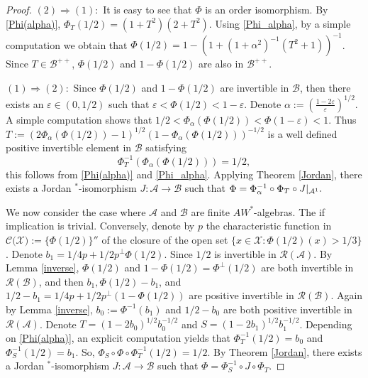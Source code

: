 \documentclass[12pt]{amsart}
\theoremstyle{definition}
\theoremstyle{remark}
\numberwithin{equation}{section}
\begin{document}
\begin{proof}
	$(\textit{2})\Rightarrow(\textit{1}):$ It is easy to see that $\Phi$  is an order isomorphism. By \eqref{Phi(alpha)}, $\Phi_T(1/2)=(1+T^2)(2+T^2)$. Using \eqref{Phi_alpha}, by a simple computation we obtain that $\Phi\left(1/2\right) = 1 - \left(1+(1+\alpha^2)^{-1}(T^2 + 1)\right)^{-1}$. Since $T\in\mathcal{B}^{++}$, $\Phi(1/2)$ and $1-\Phi(1/2)$ are also in $\mathcal{B}^{++}$.
	
	
$(\textit{1})\Rightarrow(\textit{2}):$ Since  $\Phi(1/2)$ and $1-\Phi(1/2)$ are invertible in $\mathcal{B}$, then there exists an $\varepsilon\in(0,1/2)$ such that $\varepsilon<\Phi(1/2)<1-\varepsilon$. Denote $\alpha:= \left( \frac{1-2\varepsilon}{\varepsilon}\right)^{1/2}$. A simple computation shows that $1/2<\Phi_\alpha\left( \Phi(1/2)\right)<\Phi(1-\varepsilon)<1$. Thus $T:=\left(2\Phi_\alpha(\Phi(1/2))-1\right)^{1/2}\left(1- \Phi_\alpha(\Phi(1/2))\right) ^{-1/2}$ is a well defined  positive invertible element in $\mathcal{B}$ satisfying 	$$\Phi^{-1}_{T}\left( \Phi_\alpha\left( \Phi(1/2)\right)\right)=1/2,$$ 
this follows from \eqref{Phi(alpha)} and \eqref{Phi_alpha}. Applying Theorem \ref{Jordan}, there exists a Jordan $^*$-isomorphism $J:\mathcal{A}\to\mathcal{B}$ such that $\Phi=\Phi_\alpha^{-1}\circ\Phi_{T}\circ J\arrowvert_{\mathcal{A}^1}.$	



We now consider the case where $\mathcal{A}$ and $\mathcal{B}$ are finite $AW^*$-algebras. The if implication is trivial. Conversely,  denote by $p$ the characteristic function in $\mathcal{C(X}):=\{\Phi(1/2)\}''$ of the closure of the open set $\{x\in\mathcal{X}: \Phi(1/2)(x)>1/3\}$. Denote $b_1=1/4p+1/2p^{\perp}\Phi(1/2)$. Since $1/2$ is invertible in $\mathcal{R(A)}$. By Lemma \ref{inverse}, $\Phi(1/2)$ and $1-\Phi(1/2)=\Phi^{\perp}(1/2)$ are both invertible in $\mathcal{R(B)}$, and then $b_1,\Phi(1/2)-b_1$, and $1/2-b_1=1/4p+1/2p^\perp(1-\Phi(1/2))$ are positive invertible in $\mathcal{R(B)}$. Again by Lemma \ref{inverse}, $b_0:=\Phi^{-1}(b_1)$ and $1/2-b_0$ are both positive invertible in  $\mathcal{R(A)}$. Denote $T=(1-2b_0)^{1/2}b_0^{-1/2}$ and $S=(1-2b_1)^{1/2}b_1^{-1/2}$. Depending on \eqref{Phi(alpha)}, an explicit computation yields  that $\Phi_T^{-1}(1/2)=b_0$ and $\Phi_S^{-1}(1/2)=b_1$. So,  $\Phi_S\circ\Phi\circ\Phi_T^{-1}(1/2)=1/2$. By Theorem \ref{Jordan}, there exists a  Jordan $^*$-isomorphism $J:\mathcal{A}\to\mathcal{B}$ such that $\Phi=\Phi_{S}^{-1}\circ J \circ\Phi_{T}.$
\end{proof}
\end{document}
